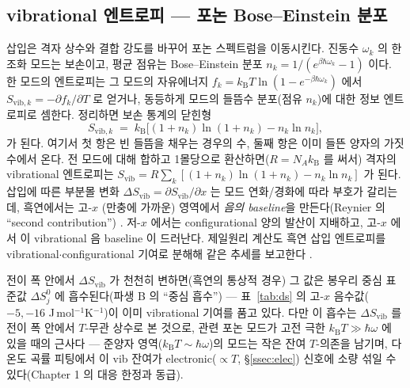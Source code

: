 \documentclass[11pt,a4paper]{article}
\newcommand{\vib}{\mathrm{vib}}
\newcommand{\kB}{k_{\mathrm B}}
\begin{document}
\subsection{vibrational 엔트로피 — 포논 Bose--Einstein 분포}
삽입은 격자 상수와 결합 강도를 바꾸어 포논 스펙트럼을 이동시킨다. 진동수 $\omega_k$ 의 한 조화 모드는 보손이고,
평균 점유는 Bose--Einstein 분포 $n_k=1/(e^{\beta\hbar\omega_k}-1)$ 이다. 한 모드의 엔트로피는 그 모드의 자유에너지
$f_k=\kB T\ln(1-e^{-\beta\hbar\omega_k})$ 에서 $S_{\vib,k}=-\partial f_k/\partial T$ 로 얻거나, 동등하게 모드의 들뜸수
분포(점유 $n_k$)에 대한 정보 엔트로피로 셈한다. 정리하면 보손 통계의 닫힌형
\begin{equation}
S_{\vib,k} \;=\; \kB\bigl[(1+n_k)\ln(1+n_k) - n_k\ln n_k\bigr],
\label{eq:Svib_mode}
\end{equation}
가 된다. 여기서 첫 항은 빈 들뜸을 채우는 경우의 수, 둘째 항은 이미 들뜬 양자의 가짓수에서 온다. 전 모드에 대해
합하고 1몰당으로 환산하면($R=N_A\kB$ 를 써서) 격자의 vibrational 엔트로피는
$S_\vib=R\sum_k[(1+n_k)\ln(1+n_k)-n_k\ln n_k]$ 가 된다. 삽입에 따른 부분몰
변화 $\Delta S_\vib=\partial S_\vib/\partial x$ 는 모드 연화/경화에 따라 부호가 갈리는데, 흑연에서는 고-$x$
(만충에 가까운) 영역에서 \emph{음의 baseline}을 만든다(Reynier 의 ``second contribution'') \cite{reynier2003}.
저-$x$ 에서는 configurational 양의 발산이 지배하고, 고-$x$ 에서 이 vibrational 음 baseline 이 드러난다. 제일원리
계산도 흑연 삽입 엔트로피를 vibrational$\cdot$configurational 기여로 분해해 같은 추세를 보고한다 \cite{jpcc2021}.

전이 폭 안에서 $\Delta S_\vib$ 가 천천히 변하면(흑연의 통상적 경우) 그 값은 봉우리 중심 표준값
$\Delta S^0_j$ 에 흡수된다(파생 B 의 ``중심 흡수'') — 표~\ref{tab:ds} 의 고-$x$ 음수값($-5,-16$
J\,mol$^{-1}$K$^{-1}$)이 이미 vibrational 기여를 품고 있다. 다만 이 흡수는 $\Delta S_\vib$ 를 전이 폭 안에서
$T$-무관 상수로 본 것으로, 관련 포논 모드가 고전 극한 $\kB T\gg\hbar\omega$ 에 있을 때의 근사다 — 준양자
영역($\kB T\!\sim\!\hbar\omega$)의 모드는 작은 잔여 $T$-의존을 남기며, 다온도 곡률 피팅에서 이 vib 잔여가
electronic($\propto T$, \S\ref{ssec:elec}) 신호에 소량 섞일 수 있다(Chapter 1 의 대응 한정과 동급).
\end{document}
